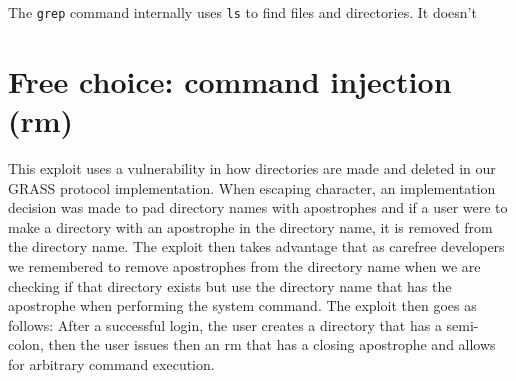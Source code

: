 \documentclass{article}
\begin{document}
The \texttt{grep} command internally uses \texttt{ls} to find files and directories.
It doesn't

\section{Free choice: command injection (rm)}
This exploit uses a vulnerability in how directories are made and deleted in our GRASS protocol implementation. When escaping character, an implementation decision
was made to pad directory names with apostrophes and if a user were to make a directory with an apostrophe in the directory name, it is removed from the directory name.
The exploit then takes advantage that as carefree developers we remembered to remove apostrophes from the directory name when we are checking if that directory exists but 
use the directory name that has the apostrophe when performing the system command. The exploit then goes as follows: After a successful login, the user creates a directory 
that has a semi-colon, then the user issues then an rm that has a closing apostrophe and allows for arbitrary command execution.
\end{document}
